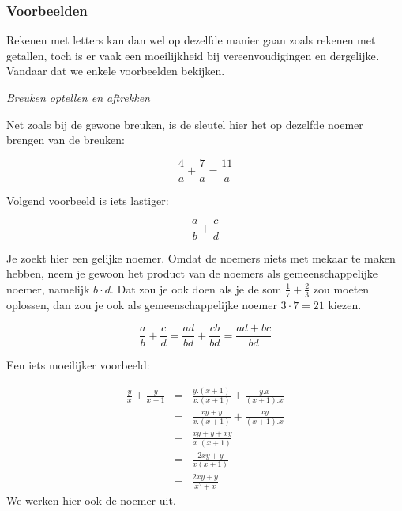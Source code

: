\subsubsection{Voorbeelden}

Rekenen met letters kan dan wel op dezelfde manier gaan
zoals rekenen met getallen, toch is er vaak een moeilijkheid bij vereenvoudigingen
en dergelijke. Vandaar dat we enkele voorbeelden bekijken.

	\emph{Breuken optellen en aftrekken}
	
	\begin{voorbeeld}
		Net zoals bij de gewone breuken, is de sleutel hier het
	op dezelfde noemer brengen van de breuken:
	
	\begin{equation*}
	{\displaystyle \frac{4}{a}+\frac{7}{a}=\frac{11}{a}}
	\end{equation*}
	\end{voorbeeld}
	
	\begin{voorbeeld}
			Volgend voorbeeld is iets lastiger:
		
		\begin{equation*}
			{\displaystyle \frac{a}{b}+\frac{c}{d}}
		\end{equation*}
	
			Je zoekt hier een gelijke noemer. Omdat de noemers niets
		met mekaar te maken hebben, neem je gewoon het product van de noemers
		als gemeenschappelijke noemer, namelijk $b\cdot d$. Dat zou je ook
		doen als je de som $\frac{1}{7}+\frac{2}{3}$ zou moeten oplossen,
		dan zou je ook als gemeenschappelijke noemer $3\cdot7=21$ kiezen.
		
		\begin{equation*}
		{\displaystyle \frac{a}{b}+\frac{c}{d}=\frac{ad}{bd}+\frac{cb}{bd}=\frac{ad+bc}{bd}}
		\end{equation*}
	\end{voorbeeld}	
		
	\begin{voorbeeld}
		Een iets moeilijker voorbeeld:
	
	\begin{eqnarray*}
		{\displaystyle \frac{y}{x}+\frac{y}{x+1}} & = & {\displaystyle \frac{y.(x+1)}{x.(x+1)}+\frac{y.x}{(x+1).x}} \\
		& = & {\displaystyle \frac{xy+y}{x.(x+1)}+\frac{xy}{(x+1).x}} \\
		& = & {\displaystyle \frac{xy+y+xy}{x.(x+1)}} \\
		& = & {\displaystyle \frac{2xy+y}{x(x+1)}} \\
		& = & {\displaystyle \frac{2xy+y}{x^{2}+x}} 
	\end{eqnarray*}
	We werken hier ook de noemer uit.
	
	\end{voorbeeld}
	
